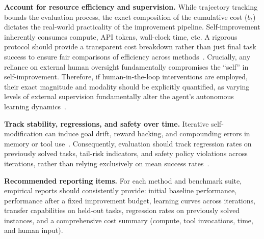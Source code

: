 \documentclass{article}
\begin{document}
\textbf{Account for resource efficiency and supervision.}
While trajectory tracking bounds the evaluation process, the exact composition of the cumulative cost ($b_t$) dictates the real-world practicality of the improvement pipeline. Self-improvement inherently consumes compute, API tokens, wall-clock time, etc. A rigorous protocol should provide a transparent cost breakdown rather than just final task success to ensure fair comparisons of efficiency across methods~\citep{lange2025shinkaevolveopenendedsampleefficientprogram, ni2025gittaskbenchbenchmarkcodeagents}. Crucially, any reliance on external human oversight fundamentally compromises the ``self'' in self-improvement. Therefore, if human-in-the-loop interventions are employed, their exact magnitude and modality should be explicitly quantified, as varying levels of external supervision fundamentally alter the agent's autonomous learning dynamics~\citep{wang2024mintevaluatingllmsmultiturn, drouin2024workarenacapablewebagents}.


\textbf{Track stability, regressions, and safety over time.}
Iterative self-modification can induce goal drift, reward hacking, and compounding errors in memory or tool use~\citep{amodei2016concreteproblemsaisafety, bai2022constitutional, ruan2024identifyingriskslmagents, yang2025drunkagentstealthymemorycorruption}. Consequently, evaluation should track regression rates on previously solved tasks, tail-risk indicators, and safety policy violations across iterations, rather than relying exclusively on mean success rates~\citep{levy2025stwebagentbenchbenchmarkevaluatingsafety, yin2025safeagentbenchbenchmarksafetask}.



\textbf{Recommended reporting items.}
For each method and benchmark suite, empirical reports should consistently provide: initial baseline performance, performance after a fixed improvement budget, learning curves across iterations, transfer capabilities on held-out tasks, regression rates on previously solved instances, and a comprehensive cost summary (compute, tool invocations, time, and human input).
\end{document}
